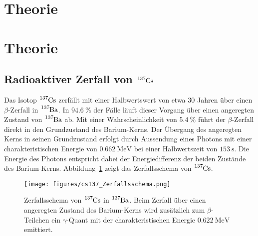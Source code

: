 \section{Theorie}
\label{sec:Theorie}
\section{Theorie}
\label{sec:theorie}

\subsection{Radioaktiver Zerfall von $\ce{^{137}Cs}$}
Das Isotop $\ce{^{137}Cs}$ zerfällt mit einer Halbwertswert von etwa $30$ Jahren
über einen $\beta$-Zerfall in $\ce{^{137}Ba}$. In $\SI{94.6}{\percent}$ der
Fälle läuft dieser Vorgang über einen angeregten Zustand von $\ce{^{137}Ba}$ ab.
Mit einer Wahrscheinlichkeit von $\SI{5.4}{\percent}$ führt der $\beta$-Zerfall
direkt in den Grundzustand des Barium-Kerns. Der Übergang des angeregten Kerns
in seinen Grundzustand erfolgt durch Aussendung eines Photons mit einer
charakteristischen Energie von $\SI{0.662}{\mega\electronvolt}$ bei einer
Halbwertszeit von $\SI{153}{\second}$. Die Energie des Photons entspricht dabei
der Energiedifferenz der beiden Zustände des Barium-Kerns.
Abbildung~\ref{fig:zerfallsschema} zeigt das Zerfallsschema von $\ce{^{137}Cs}$.

\begin{figure}
  \centering
  \texttt{[image: figures/cs137\_Zerfallsschema.png]}
  \caption{Zerfallsschema von $\ce{^{137}Cs}$ in $\ce{^{137}Ba}$. Beim Zerfall
  über einen angeregten Zustand des Barium-Kerns wird zusätzlich zum
  $\beta$-Teilchen ein $\gamma$-Quant mit der charakteristischen Energie
  $\SI{0.622}{\mega\electronvolt}$ emittiert.}
  \label{fig:zerfallsschema}
\end{figure}

